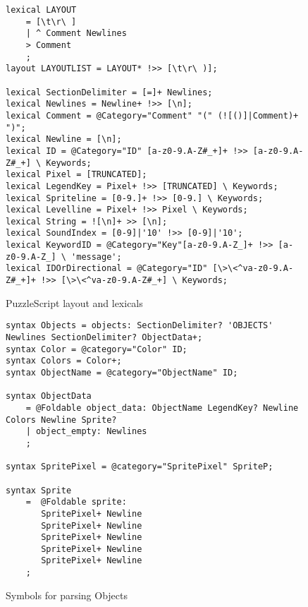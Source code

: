 \begin{figure}[!t]
\begin{lstlisting}[language=rascal]
lexical LAYOUT 
	= [\t\r\ ]
	| ^ Comment Newlines
	> Comment
	;
layout LAYOUTLIST = LAYOUT* !>> [\t\r\ )];

lexical SectionDelimiter = [=]+ Newlines;
lexical Newlines = Newline+ !>> [\n];
lexical Comment = @Category="Comment" "(" (![()]|Comment)+ ")";
lexical Newline = [\n];
lexical ID = @Category="ID" [a-z0-9.A-Z#_+]+ !>> [a-z0-9.A-Z#_+] \ Keywords;
lexical Pixel = [TRUNCATED];
lexical LegendKey = Pixel+ !>> [TRUNCATED] \ Keywords;
lexical Spriteline = [0-9.]+ !>> [0-9.] \ Keywords;
lexical Levelline = Pixel+ !>> Pixel \ Keywords;
lexical String = ![\n]+ >> [\n];
lexical SoundIndex = [0-9]|'10' !>> [0-9]|'10';
lexical KeywordID = @Category="Key"[a-z0-9.A-Z_]+ !>> [a-z0-9.A-Z_] \ 'message';
lexical IDOrDirectional = @Category="ID" [\>\<^va-z0-9.A-Z#_+]+ !>> [\>\<^va-z0-9.A-Z#_+] \ Keywords;
\end{lstlisting}
\vspace*{-8pt}
\caption{PuzzleScript layout and lexicals}
\label{fig:PuzzleScript Lexicals}
\end{figure}

\begin{figure}[!t]
\begin{lstlisting}[language=rascal]    
syntax Objects = objects: SectionDelimiter? 'OBJECTS' Newlines SectionDelimiter? ObjectData+;
syntax Color = @category="Color" ID;
syntax Colors = Color+;
syntax ObjectName = @category="ObjectName" ID;

syntax ObjectData
	= @Foldable object_data: ObjectName LegendKey? Newline Colors Newline Sprite?
	| object_empty: Newlines
	;
	
syntax SpritePixel = @category="SpritePixel" SpriteP;

syntax Sprite 
    =  @Foldable sprite: 
       SpritePixel+ Newline
       SpritePixel+ Newline
       SpritePixel+ Newline 
       SpritePixel+ Newline
       SpritePixel+ Newline
    ;
\end{lstlisting}
\vspace*{-8pt}
\caption{Symbols for parsing Objects}
\label{fig:example_symbol}
\end{figure}
